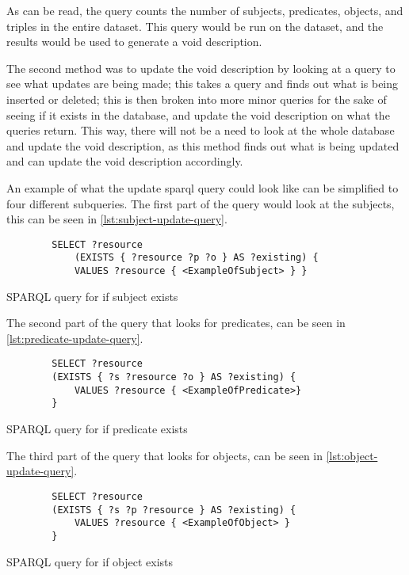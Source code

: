 As can be read, the query counts the number of subjects, predicates, objects, and triples in the entire dataset. This query would be run on the dataset, and the results would be used to generate a \gls{void} description.


The second method was to update the \gls{void} description by looking at a query to see what updates are being made; this takes a query and finds out what is being inserted or deleted; this is then broken into more minor queries for the sake of seeing if it exists in the database, and update the \gls{void} description on what the queries return. This way, there will not be a need to look at the whole database and update the \gls{void} description, as this method finds out what is being updated and can update the \gls{void} description accordingly.

An example of what the update \gls{sparql} query could look like can be simplified to four different subqueries. The first part of the query would look at the subjects, this can be seen in \autoref{lst:subject-update-query}.

\begin{listing}[htb!]
    \begin{verbatim}          
        SELECT ?resource
            (EXISTS { ?resource ?p ?o } AS ?existing) {
            VALUES ?resource { <ExampleOfSubject> } }
    \end{verbatim}
    \caption{SPARQL query for if subject exists}
    \label{lst:subject-update-query}
\end{listing}

The second part of the query that looks for predicates, can be seen in \autoref{lst:predicate-update-query}.
\begin{listing}[htb!]
    \begin{verbatim}          
        SELECT ?resource 
        (EXISTS { ?s ?resource ?o } AS ?existing) { 
            VALUES ?resource { <ExampleOfPredicate>}
        } 
    \end{verbatim}
    \caption{SPARQL query for if predicate exists}
    \label{lst:predicate-update-query}
\end{listing}


The third part of the query that looks for objects, can be seen in \autoref{lst:object-update-query}.

\begin{listing}[htb!]
    \begin{verbatim}          
        SELECT ?resource 
        (EXISTS { ?s ?p ?resource } AS ?existing) { 
            VALUES ?resource { <ExampleOfObject> } 
        }
    \end{verbatim}
    \caption{SPARQL query for if object exists}
    \label{lst:object-update-query}
\end{listing}

